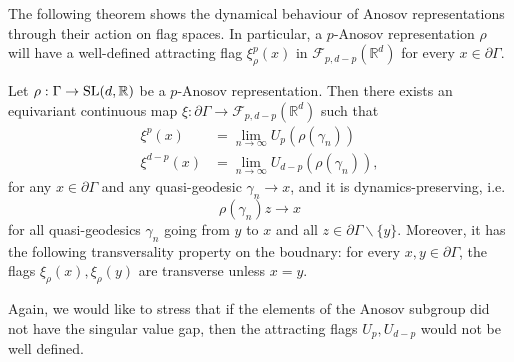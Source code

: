 \documentclass{report}
\begin{document}
The following theorem shows the dynamical behaviour of Anosov representations through their action on flag spaces.
In particular, a $p$-Anosov representation $\rho$ will have a well-defined attracting flag $\xi^p_\rho(x)$ in $\mathcal F_{p, d-p}(\mathbb R^d)$ for every $x \in \partial \Gamma$.
\begin{theorem}\label{thm:boundary_map}
    Let $\rho: \Gamma \to \operatorname{{\mathrm{SL}}}(d, \mathbb R)$ be a $p$-Anosov representation.
    Then there exists an equivariant continuous map $\xi: \partial \Gamma \to \mathcal F_{p, d-p}(\mathbb R^d) $ such that
    \begin{align*}
        \xi^p(x) &= \lim_{n \to \infty} U_p(\rho(\gamma_n))\\
        \xi^{d-p}(x) &= \lim_{n \to \infty} U_{d-p}(\rho(\gamma_n)),
    \end{align*}
    for any $x \in \partial \Gamma$ and any quasi-geodesic $\gamma_n \to x$, and
    it is dynamics-preserving, i.e.
    \[
    \rho(\gamma_n) z \to x
    \]
    for all quasi-geodesics $\gamma_n$ going from $y$ to $x$ and all $z \in \partial \Gamma \backslash \{ y \}$.
    Moreover, it has the following transversality property on the boudnary: for every $x, y \in \partial \Gamma$, the flags $\xi_\rho(x), \xi_\rho(y)$ are transverse unless $x=y$.
\end{theorem}
Again, we would like to stress that if the elements of the Anosov subgroup did not have the singular value gap, then the attracting flags $U_p, U_{d-p}$ would not be well defined.
\end{document}
